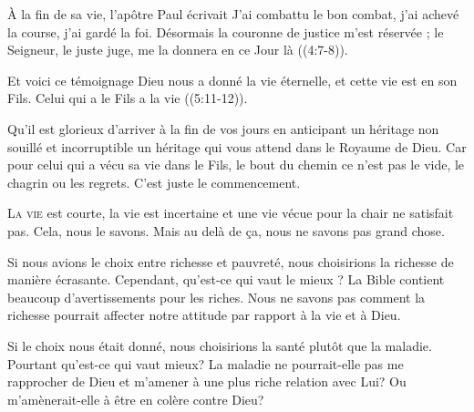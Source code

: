 
À la fin de sa vie, l'apôtre Paul écrivait\frcolon{} 
 \Og J'ai combattu le bon combat, j'ai achevé la course, j'ai gardé la foi.
 Désormais la couronne de justice m'est réservée ;
 le Seigneur, le juste juge, me la donnera en ce Jour là \Fg{}
 ((4:7-8)). 

Et voici ce témoignage\frcolon{}
 \Og Dieu nous a donné la vie éternelle, et cette vie est en son Fils.
 Celui qui a le Fils a la vie \Fg{} ((5:11-12)). 

Qu'il est glorieux d'arriver à la fin de vos jours en anticipant un héritage
 non souillé et incorruptible \ocadr un héritage qui vous attend
 dans le Royaume de Dieu.
 Car pour celui qui a vécu sa vie dans le Fils, le bout du chemin
 ce n'est pas le vide, le chagrin ou les regrets. C'est juste le commencement. 

\dvrule






\lettrine{L}{a vie} est courte, la vie est incertaine et une vie vécue
 pour la chair ne satisfait pas. Cela, nous le savons.
 Mais au delà de \c{c}a, nous ne savons pas grand chose. 

Si nous avions le choix entre richesse et pauvreté,
 nous choisirions la richesse de manière écrasante.
 Cependant, 
 qu'est-ce qui vaut le mieux ? 
 La Bible contient beaucoup d'avertissements pour les riches.
 Nous ne savons pas comment la richesse pourrait affecter
 notre attitude par rapport à la vie et à Dieu. 


Si le choix nous était donné, nous choisirions la santé
 plutôt que la maladie. Pourtant qu'est-ce qui vaut mieux?
 La maladie ne pourrait-elle pas me rapprocher de Dieu
 et m'amener à une plus riche relation avec Lui?
 Ou m'amènerait-elle à être en colère contre Dieu? 

